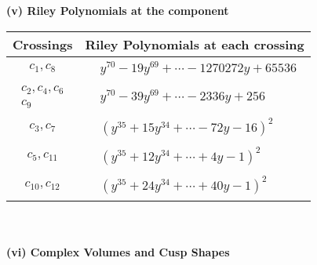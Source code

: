 \documentclass[1p]{elsarticle_modified}
\theoremstyle{definition}
\begin{document}
\newpage\renewcommand{\arraystretch}{1}
\flushleft \textbf{(v) Riley Polynomials at the component}\newline \\
\begin{tabular}{m{50pt}|m{274pt}}
Crossings & \hspace{64pt}Riley Polynomials at each crossing \\
\hline $$\begin{aligned}c_{1},c_{8}\end{aligned}$$&$\begin{aligned}
&y^{70}-19 y^{69}+\cdots-1270272 y+65536
\end{aligned}$\\
\hline $$\begin{aligned}c_{2},c_{4},c_{6}\\c_{9}\end{aligned}$$&$\begin{aligned}
&y^{70}-39 y^{69}+\cdots-2336 y+256
\end{aligned}$\\
\hline $$\begin{aligned}c_{3},c_{7}\end{aligned}$$&$\begin{aligned}
&(y^{35}+15 y^{34}+\cdots-72 y-16)^{2}
\end{aligned}$\\
\hline $$\begin{aligned}c_{5},c_{11}\end{aligned}$$&$\begin{aligned}
&(y^{35}+12 y^{34}+\cdots+4 y-1)^{2}
\end{aligned}$\\
\hline $$\begin{aligned}c_{10},c_{12}\end{aligned}$$&$\begin{aligned}
&(y^{35}+24 y^{34}+\cdots+40 y-1)^{2}
\end{aligned}$\\
\hline
\end{tabular}\\~\\
\newpage\flushleft \textbf{(vi) Complex Volumes and Cusp Shapes}
\end{document}
